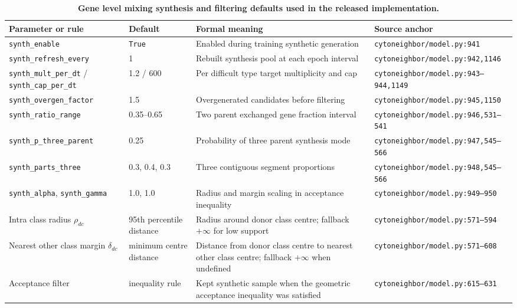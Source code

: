 \documentclass[11pt]{article}
\begin{document}
\begin{table}[htbp]
\centering
\caption{\textbf{Gene level mixing synthesis and filtering defaults used in the released implementation.}}
\label{tab:s9_genecutmix_defaults}
\scriptsize
\begin{tabularx}{\textwidth}{@{}L{0.22\textwidth} L{0.15\textwidth} Y L{0.22\textwidth}@{}}
\toprule
\textbf{Parameter or rule} & \textbf{Default} & \textbf{Formal meaning} & \textbf{Source anchor} \\
\midrule
\texttt{synth\_enable} & \texttt{True} & Enabled during training synthetic generation & \texttt{cytoneighbor/model.py:941} \\
\texttt{synth\_refresh\_every} & 1 & Rebuilt synthesis pool at each epoch interval & \texttt{cytoneighbor/model.py:942,1146} \\
\texttt{synth\_mult\_per\_dt} / \texttt{synth\_cap\_per\_dt} & 1.2 / 600 & Per difficult type target multiplicity and cap & \texttt{cytoneighbor/model.py:943--944,1149} \\
\texttt{synth\_overgen\_factor} & 1.5 & Overgenerated candidates before filtering & \texttt{cytoneighbor/model.py:945,1150} \\
\texttt{synth\_ratio\_range} & 0.35--0.65 & Two parent exchanged gene fraction interval & \texttt{cytoneighbor/model.py:946,531--541} \\
\texttt{synth\_p\_three\_parent} & 0.25 & Probability of three parent synthesis mode & \texttt{cytoneighbor/model.py:947,545--566} \\
\texttt{synth\_parts\_three} & 0.3, 0.4, 0.3 & Three contiguous segment proportions & \texttt{cytoneighbor/model.py:948,545--566} \\
\texttt{synth\_alpha}, \texttt{synth\_gamma} & 1.0, 1.0 & Radius and margin scaling in acceptance inequality & \texttt{cytoneighbor/model.py:949--950} \\
Intra class radius \(\rho_{dc}\) & 95th percentile distance & Radius around donor class centre; fallback \(+\infty\) for low support & \texttt{cytoneighbor/model.py:571--594} \\
Nearest other class margin \(\delta_{dc}\) & minimum centre distance & Distance from donor class centre to nearest other class centre; fallback \(+\infty\) when undefined & \texttt{cytoneighbor/model.py:571--608} \\
Acceptance filter & inequality rule & Kept synthetic sample when the geometric acceptance inequality was satisfied & \texttt{cytoneighbor/model.py:615--631} \\
\bottomrule
\end{tabularx}
\end{table}
\end{document}
